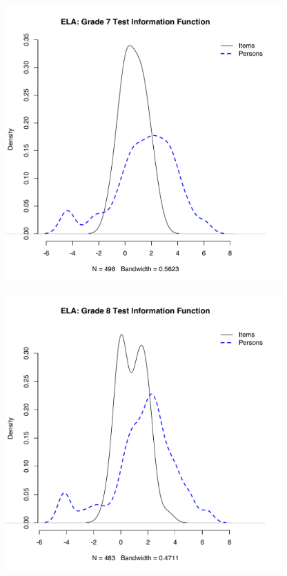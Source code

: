 \documentclass[]{article}
\begin{document}
\begin{figure}
\centering
\includegraphics[height=4.16667in]{ipdens/ela7ipdens.pdf}
\caption{}
\end{figure}

\begin{figure}
\centering
\includegraphics[height=4.16667in]{ipdens/ela8ipdens.pdf}
\caption{}
\end{figure}
\end{document}
